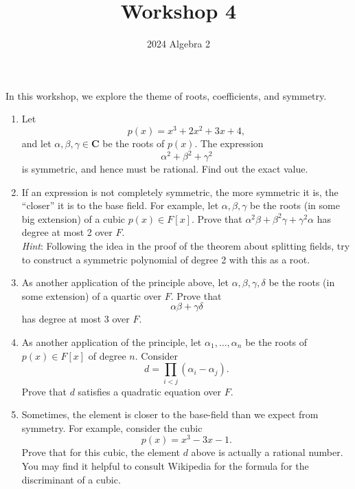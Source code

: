 \documentclass[12pt]{amsart}
\author{2024 Algebra 2}
\date{}
\title{Workshop 4}
\begin{document}
\maketitle
In this workshop, we explore the theme of roots, coefficients, and symmetry.

\begin{enumerate}
\item Let
\[ p(x) = x^3 + 2x^2 + 3x + 4,\]
and let \(\alpha, \beta, \gamma \in \mathbf{C}\) be the roots of \(p(x)\).
The expression
\[ \alpha^2 + \beta^2 + \gamma^{2}\]
is symmetric, and hence must be rational.
Find out the exact value.

\item If an expression is not completely symmetric, the more symmetric it is, the ``closer'' it is to the base field.
For example, let \(\alpha, \beta, \gamma\) be the roots (in some big extension) of a cubic \(p(x) \in F[x]\).
Prove that \(\alpha^2 \beta + \beta^2 \gamma + \gamma^2\alpha\) has degree at most 2 over \(F\).\\
\emph{Hint}: Following the idea in the proof of the theorem about splitting fields, try to construct a symmetric polynomial of degree 2 with this as a root.

\item As another application of the principle above, let \(\alpha, \beta, \gamma, \delta\) be the roots (in some extension) of a quartic over \(F\).
Prove that
\[ \alpha\beta + \gamma\delta\]
has degree at most 3 over \(F\).

\item As another application of the principle, let \(\alpha_1, \dots, \alpha_n\) be the roots of \(p(x) \in F[x]\) of degree \(n\).
Consider
\[ d = \prod_{i < j}(\alpha_i - \alpha_j).\]
Prove that \(d\) satisfies a quadratic equation over \(F\).

\item Sometimes, the element is closer to the base-field than we expect from symmetry.
For example, consider the cubic
\[ p(x) = x^3-3x-1.\]
Prove that for this cubic, the element \(d\) above is actually a rational number.
You may find it helpful to consult Wikipedia for the formula for the discriminant of a cubic.
\end{enumerate}
\end{document}
